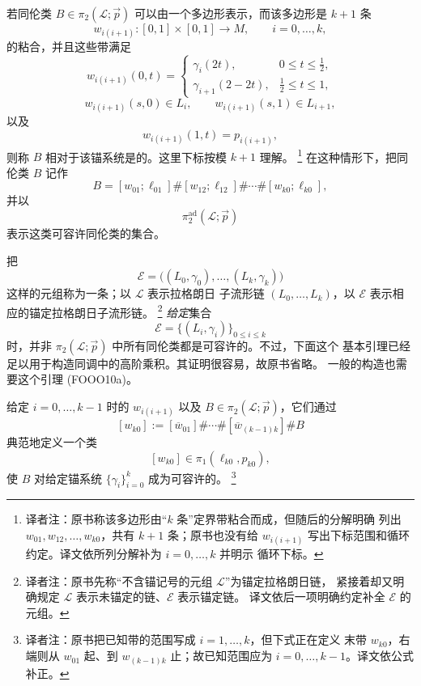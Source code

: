 \begin{definition}
\label{def:anchor-admissible-class}
若同伦类 $B\in\pi_2(\mathcal L;\vec p)$ 可以由一个多边形表示，而该多边形是
$k+1$ 条\termBoundingBand{}
\[
  w_{i(i+1)}:[0,1]\times[0,1]\longrightarrow M,
  \qquad i=0,\ldots,k,
\]
的粘合，并且这些带满足
\[
  w_{i(i+1)}(0,t)=
  \begin{cases}
    \gamma_i(2t),&0\leq t\leq\frac12,\\
    \gamma_{i+1}(2-2t),&\frac12\leq t\leq1,
  \end{cases}
\]
\[
  w_{i(i+1)}(s,0)\in L_i,
  \qquad
  w_{i(i+1)}(s,1)\in L_{i+1},
\]
以及
\[
  w_{i(i+1)}(1,t)=p_{i(i+1)},
\]
则称 $B$ 相对于该锚系统是\termAdmissible{}的。这里下标按模 $k+1$ 理解。
\footnote{译者注：原书称该多边形由“$k$ 条”定界带粘合而成，但随后的分解明确
列出 $w_{01},w_{12},\ldots,w_{k0}$，共有 $k+1$ 条；原书也没有给
$w_{i(i+1)}$ 写出下标范围和循环约定。译文依所列分解补为 $i=0,\ldots,k$ 并明示
循环下标。}
在这种情形下，把同伦类 $B$ 记作
\[
  B=[w_{01};\ell_{01}]\#[w_{12};\ell_{12}]\#\cdots
    \#[w_{k0};\ell_{k0}],
\]
并以
\[
  \pi_2^{\mathrm{ad}}(\mathcal L;\vec p)
\]
表示这类可容许同伦类的集合。
\end{definition}

把
\[
  \mathcal E=\bigl((L_0,\gamma_0),\ldots,(L_k,\gamma_k)\bigr)
\]
这样的元组称为一条\emph{\termAnchoredLagrangianChain{}}；以 $\mathcal L$ 表示拉格朗日
子流形链 $(L_0,\ldots,L_k)$，以 $\mathcal E$ 表示相应的锚定拉格朗日子流形链。
\footnote{译者注：原书先称“不含锚记号的元组 $\mathcal L$”为锚定拉格朗日链，
紧接着却又明确规定 $\mathcal L$ 表示未锚定的链、$\mathcal E$ 表示锚定链。
译文依后一项明确约定补全 $\mathcal E$ 的元组。}
\emph{给定}集合
\[
  \mathcal E=\{(L_i,\gamma_i)\}_{0\leq i\leq k}
\]
时，并非 $\pi_2(\mathcal L;\vec p)$ 中所有同伦类都是可容许的。不过，下面这个
基本引理已经足以用于构造\personFloer{}同调中的高阶乘积。其证明很容易，故原书省略。
一般\termFukayaCategory{}的构造也需要这个引理 (FOOO10a)。

\begin{lemma}
\label{lem:complete-admissible-anchor-bands}
给定 $i=0,\ldots,k-1$ 时的 $w_{i(i+1)}$ 以及
$B\in\pi_2(\mathcal L;\vec p)$，它们通过
\[
  [w_{k0}]
  :=[\overline w_{01}]\#\cdots
    \#[\overline w_{(k-1)k}]\#B
\]
典范地定义一个类
\[
  [w_{k0}]\in\pi_1(\ell_{k0},p_{k0}),
\]
使 $B$ 对给定锚系统 $\{\gamma_i\}_{i=0}^k$ 成为可容许的。
\footnote{译者注：原书把已知带的范围写成 $i=1,\ldots,k$，但下式正在定义
末带 $w_{k0}$，右端则从 $w_{01}$ 起、到 $w_{(k-1)k}$ 止；故已知范围应为
$i=0,\ldots,k-1$。译文依公式补正。}
\end{lemma}


